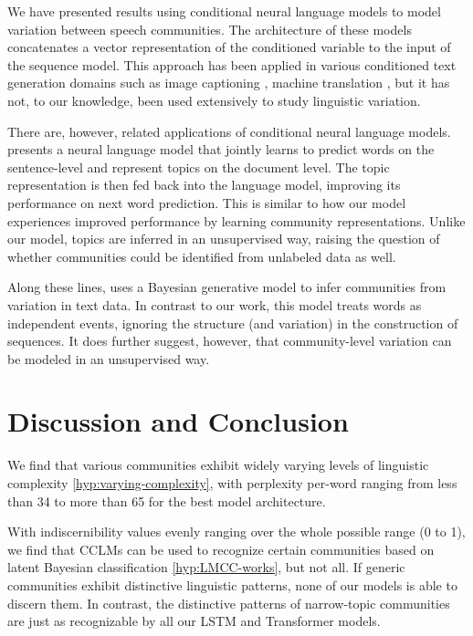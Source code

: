 \documentclass[11pt]{article}
\begin{document}
We have presented results using conditional neural language models
to model variation between speech communities.
The architecture of these models concatenates a vector representation
of the conditioned variable to the input of the sequence model.
This approach has been applied in various conditioned text generation domains such as 
image captioning \citep{Vinyals2015}, machine translation \citep{Kalchbrenner2013},
but it has not, to our knowledge, been used extensively to study linguistic variation.

There are, however, related applications of conditional neural language models.
\citet{Lau2017a} presents a neural language model that jointly learns to predict
words on the sentence-level and represent topics on the document level.
The topic representation is then fed back into the language model, 
improving its performance on next word prediction.
This is similar to how our model experiences improved performance
by learning community representations. 
Unlike our model, topics are inferred in an unsupervised way, 
raising the question of whether communities could be identified from 
unlabeled data as well.

Along these lines, \citet{OConnor2010} uses a Bayesian generative
model to infer communities from variation in text data.  In contrast
to our work, this model treats words as independent events, ignoring
the structure (and variation) in the construction of sequences.  It
does further suggest, however, that community-level variation can be
modeled in an unsupervised way.

\section{Discussion and Conclusion}

We find that various communities exhibit widely varying levels of
linguistic complexity \ref{hyp:varying-complexity}, with perplexity
per-word ranging from less than 34 to more than 65 for the best model 
architecture.

With indiscernibility values evenly ranging over the whole possible
range (0 to 1), we find that CCLMs can be used to recognize certain
communities based on latent Bayesian classification
\ref{hyp:LMCC-works}, but not all.  If generic communities exhibit
distinctive linguistic patterns, none of our models is able to discern
them. In contrast, the distinctive patterns of narrow-topic
communities are just as recognizable by all our LSTM and Transformer
models.
\end{document}
